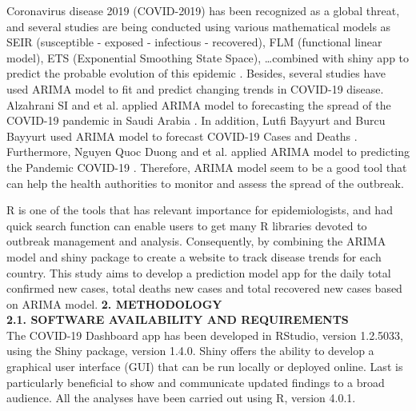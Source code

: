 \documentclass[12pt, a4paper,oneside]{book}
\theoremstyle{definition}
\begin{document}
Coronavirus disease 2019 (COVID-2019) has been recognized as a global threat, and several studies are being conducted using various mathematical models as SEIR (susceptible - exposed - infectious - recovered), FLM (functional linear model), ETS (Exponential Smoothing State Space),  \dots  combined with shiny app to predict the probable evolution of this epidemic \cite{1}. Besides, several studies have used ARIMA model to fit and predict changing trends in COVID-19 disease. Alzahrani SI and et al. applied ARIMA model to forecasting the spread of the COVID-19 pandemic in Saudi Arabia \cite{2}. In addition, Lutfi Bayyurt and Burcu Bayyurt used ARIMA model to forecast COVID-19 Cases and Deaths \cite{3}. Furthermore, Nguyen Quoc Duong and et al. applied ARIMA model to predicting the Pandemic COVID-19 \cite{4}. Therefore, ARIMA model seem to be a good tool that can help the health authorities to monitor and assess the spread of the outbreak.

R is one of the tools that has relevant importance for epidemiologists, and had quick search function can enable users to get many R libraries devoted to outbreak management and analysis. Consequently, by combining the ARIMA model and shiny package to create a website to track disease trends for each country. This study aims to develop a prediction model app for the daily total confirmed new cases, total deaths new cases and total recovered new cases based on ARIMA model.
\vskip 0.5cm
\noindent 
{\bf 2. METHODOLOGY}\\
{\bf 2.1. SOFTWARE AVAILABILITY AND REQUIREMENTS}\\

The COVID-19 Dashboard app has been developed in RStudio, version 1.2.5033, using the Shiny package, version 1.4.0. Shiny offers the ability to develop a graphical user interface (GUI) that can be run locally or deployed online. Last is particularly beneficial to show and communicate updated findings to a broad audience. All the analyses have been carried out using R, version 4.0.1.
\end{document}
